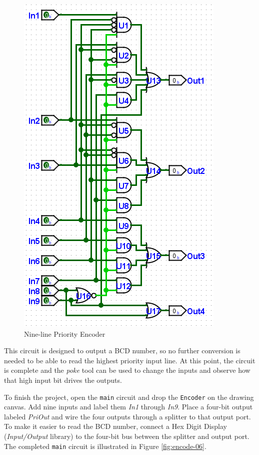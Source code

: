 \begin{figure}[H]
	\centering
	\includegraphics[width=\maxwidth{.95\linewidth}]{gfx/encode-05}
	\caption{Nine-line Priority Encoder}
	\label{fig:encode-05}
\end{figure}

This circuit is designed to output a \acf{BCD} number, so no further conversion is needed to be able to read the highest priority input line. At this point, the circuit is complete and the \textit{poke} tool can be used to change the inputs and observe how that high input bit drives the outputs.

To finish the project, open the \lstinline[columns=fixed]|main| circuit and drop the \lstinline[columns=fixed]|Encoder| on the drawing canvas. Add nine inputs and label them \textit{In1} through \textit{In9}. Place a four-bit output labeled \textit{PriOut} and wire the four outputs through a splitter to that output port. To make it easier to read the \ac{BCD} number, connect a Hex Digit Display (\textit{Input/Output} library) to the four-bit bus between the splitter and output port. The completed \lstinline[columns=fixed]|main| circuit is illustrated in Figure \ref{fig:encode-06}.

